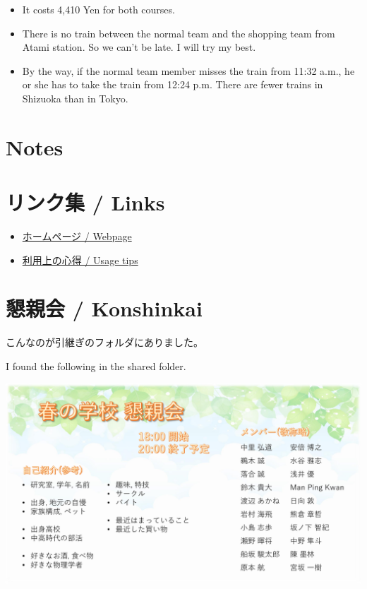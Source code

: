 \documentclass[unicode,a4paper,11pt]{ltjsarticle}
\begin{document}
\begin{itemize}
  \item
        It costs 4,410 Yen for both courses.
  \item
        There is no train between the normal team and the shopping team from Atami station. So we can't be late. I will try my best.
  \item
        By the way, if the normal team member misses the train from 11:32 a.m., he or she has to take the train from 12:24 p.m. There are fewer trains in Shizuoka than in Tokyo.
\end{itemize}


\section{Notes}






\clearpage

\section{リンク集 / Links}

\begin{itemize}
  \item
        \href{https://www.waseda.jp/inst/student/facility/seminar/facility/izukawana}{ホームページ / Webpage}
  \item
        \href{https://www.waseda.jp/inst/student/facility/seminar/flow/tips}{利用上の心得 / Usage tips}
\end{itemize}

\section{懇親会 / Konshinkai}

こんなのが引継ぎのフォルダにありました。

I found the following in the shared folder.

\begin{center}
  \includegraphics[width=1.0\linewidth]{konshinkai.pdf}
\end{center}
\end{document}

